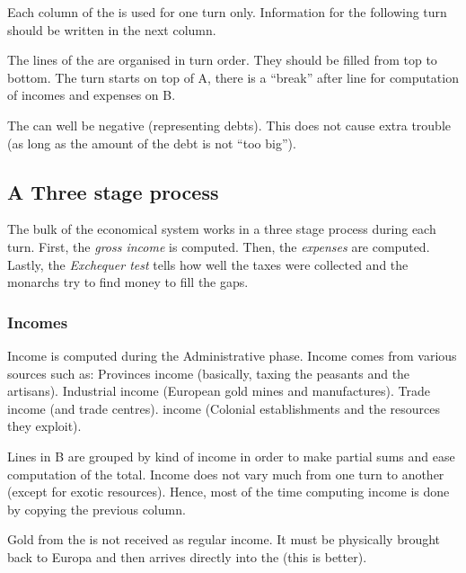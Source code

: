 \aparag Each column of the \EcoRS is used for one turn only. Information for
the following turn should be written in the next column.

\aparag The lines of the \EcoRS are organised in turn order. They should be
filled from top to bottom.
\bparag The turn starts on top of \EcoRS A, there is a ``break'' after line
 for computation of incomes and expenses on
\EcoRS B.

\aparag The \RT can well be negative (representing debts). This does not cause
extra trouble (as long as the amount of the debt is not ``too big'').



\subsection{A Three stage process}

\aparag The bulk of the economical system works in a three stage process
during each turn.
\bparag First, the \emph{gross income} is computed.
\bparag Then, the \emph{expenses} are computed.
\bparag Lastly, the \emph{Exchequer test} tells how well the taxes were
collected and the monarchs try to find money to fill the gaps.

 


\subsubsection{Incomes}
\aparag Income is computed during the Administrative phase. Income comes from
various sources such as:
\bparag Provinces income (basically, taxing the peasants and the artisans).
\bparag Industrial income (European gold mines and manufactures).
\bparag Trade income (\TradeFLEET and trade centres).
\bparag \ROTW income (Colonial establishments and the resources they exploit).

\aparag Lines in \EcoRS B are grouped by kind of income in order to make
partial sums and ease computation of the total.
\bparag Income does not vary much from one turn to another (except for exotic
resources). Hence, most of the time computing income is done by copying the
previous column.

\aparag Gold from the \ROTW is not received as regular income. It must be
physically brought back to Europa and then arrives directly into the \RT (this
is better).

